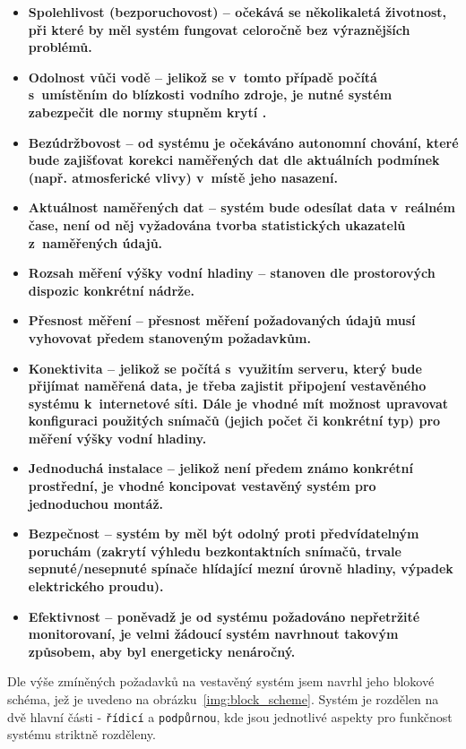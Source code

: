         \begin{itemize}
            \item \bf Spolehlivost (bezporuchovost) \rm -- očekává se několikaletá životnost, při které by měl systém fungovat celoročně bez výraznějších problémů.
            \item \bf Odolnost vůči vodě \rm -- jelikož se v~tomto případě počítá s~umístěním do blízkosti vodního zdroje, je nutné systém zabezpečit dle normy  stupněm krytí .
            \item \bf Bezúdržbovost \rm -- od systému je očekáváno autonomní chování, které bude zajišťovat korekci naměřených dat dle aktuálních podmínek (např. atmosferické vlivy) v~místě jeho nasazení. 
            \item \bf Aktuálnost naměřených dat \rm -- systém bude odesílat data v~reálném čase, není od něj vyžadována tvorba statistických ukazatelů z~naměřených údajů.
            \item \bf Rozsah měření výšky vodní hladiny \rm -- stanoven dle prostorových dispozic konkrétní nádrže.
            \item \bf Přesnost měření \rm -- přesnost měření požadovaných údajů musí vyhovovat předem stanoveným požadavkům.
            \item \bf Konektivita \rm -- jelikož se počítá s~využitím serveru, který bude přijímat naměřená data, je třeba zajistit připojení vestavěného systému k~internetové síti. Dále je vhodné mít možnost upravovat konfiguraci použitých snímačů (jejich počet či konkrétní typ) pro měření výšky vodní hladiny.
            \item \bf Jednoduchá instalace \rm -- jelikož není předem známo konkrétní prostřední, je vhodné koncipovat vestavěný systém pro jednoduchou montáž.
            \item \bf Bezpečnost \rm -- systém by měl být odolný proti předvídatelným poruchám (zakrytí výhledu bezkontaktních snímačů, trvale sepnuté/nesepnuté spínače hlídající mezní úrovně hladiny, výpadek elektrického proudu).
            \item \bf Efektivnost \rm -- poněvadž je od systému požadováno nepřetržité monitorovaní, je velmi žádoucí systém navrhnout takovým způsobem, aby byl energeticky nenáročný. 
        \end{itemize}

        Dle výše zmíněných požadavků na vestavěný systém jsem navrhl jeho blokové schéma, jež je uvedeno na obrázku~\ref{img:block_scheme}. Systém je rozdělen na dvě hlavní části - \texttt{řídicí} a \texttt{podpůrnou}, kde jsou jednotlivé aspekty pro funkčnost systému striktně rozděleny.

